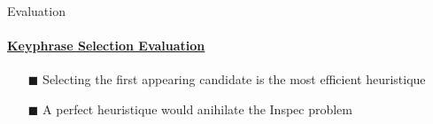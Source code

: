   \begin{frame}[label=keyphrase_selection_evaluation]{Evaluation}
    \framesubtitle{\hyperlink{keyphrase_selection_evaluation_backup}{Keyphrase Selection Evaluation}}
    
    \begin{center}
    \end{center}

    \begin{itemize}
      \item[\footnotesize\color{green}$\blacksquare$]{Selecting the first
                                                      appearing candidate is the
                                                      most efficient
                                                      heuristique}
      \item[\footnotesize\color{green}$\blacksquare$]{A perfect heuristique
                                                      would anihilate the Inspec
                                                      problem}
    \end{itemize}
  \end{frame}

